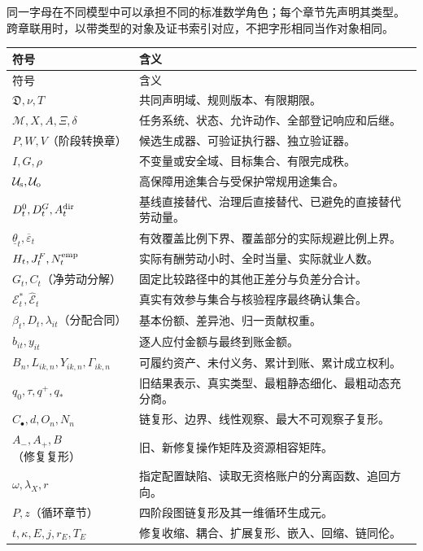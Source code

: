 \documentclass[UTF8,12pt,a4paper,openany,fontset=none,zihao=false]{ctexrep}
\theoremstyle{definition}
\newcommand{\1}{\mathbf 1}
\begin{document}
同一字母在不同模型中可以承担不同的标准数学角色；每个章节先声明其类型。
跨章联用时，以带类型的对象及证书索引对应，不把字形相同当作对象相同。
\begingroup
\small
\renewcommand{\arraystretch}{1.15}
\begin{longtable}{p{}p{}}
\toprule
符号 & 含义\\
\midrule
\endfirsthead
\toprule
符号 & 含义\\
\midrule
\endhead
\(\mathfrak D,\nu,T\) & 共同声明域、规则版本、有限期限。\\
\(\mathcal M,X,A,\Xi,\delta\) & 任务系统、状态、允许动作、全部登记响应和后继。\\
\(P,W,V\)（阶段转换章） & 候选生成器、可验证执行器、独立验证器。\\
\(I,G,\rho\) & 不变量或安全域、目标集合、有限完成秩。\\
\(\mathcal U_{\rm s},\mathcal U_{\rm o}\) & 高保障用途集合与受保护常规用途集合。\\
\(D_t^0,D_t^G,A_t^{\rm dir}\) & 基线直接替代、治理后直接替代、已避免的直接替代劳动量。\\
\(\underline\theta_t,\overline\varepsilon_t\) & 有效覆盖比例下界、覆盖部分的实际规避比例上界。\\
\(H_t,J_t^F,N_t^{\rm emp}\) & 实际有酬劳动小时、全时当量、实际就业人数。\\
\(G_t,C_t\)（净劳动分解） & 固定比较路径中的其他正差分与负差分合计。\\
\(\mathcal E_t^\ast,\widehat{\mathcal E}_t\) & 真实有效参与集合与核验程序最终确认集合。\\
\(\beta_t,D_t,\lambda_{it}\)（分配合同） & 基本份额、差异池、归一贡献权重。\\
\(b_{it},y_{it}\) & 逐人应付金额与最终到账金额。\\
\(B_n,L_{ik,n},Y_{ik,n},\Gamma_{ik,n}\) & 可履约资产、未付义务、累计到账、累计成立权利。\\
\(q_0,\tau,q^+,q_\ast\) & 旧结果表示、真实类型、最粗静态细化、最粗动态充分商。\\
\(C_\bullet,d,O_n,N_n\) & 链复形、边界、线性观察、最大不可观察子复形。\\
\(A_-,A_+,B\)（修复复形） & 旧、新修复操作矩阵及资源相容矩阵。\\
\(\omega,\lambda_X,r\) & 指定配置缺陷、读取无资格账户的分离函数、追回方向。\\
\(P,z\)（循环章节） & 四阶段图链复形及其一维循环生成元。\\
\(t,\kappa,E,j,r_E,T_E\) & 修复收缩、耦合、扩展复形、嵌入、回缩、链同伦。\\

\end{longtable}
\end{document}
